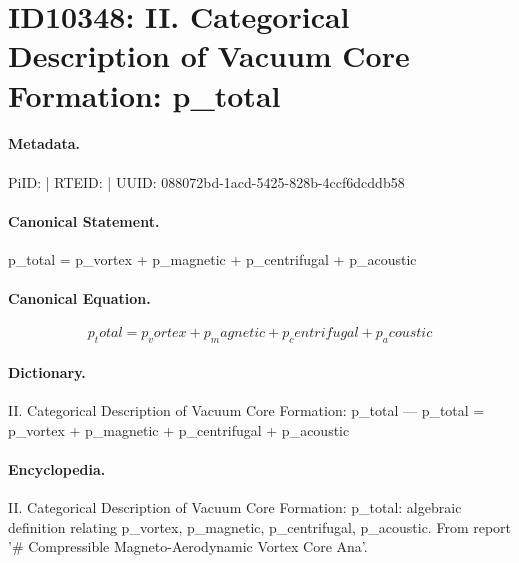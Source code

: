 \section*{ID10348: II. Categorical Description of Vacuum Core Formation: p\_total}
\paragraph{Metadata.}
PiID:  | RTEID:  | UUID: 088072bd-1acd-5425-828b-4ccf6dcddb58

\paragraph{Canonical Statement.}
p\_total = p\_vortex + p\_magnetic + p\_centrifugal + p\_acoustic

\paragraph{Canonical Equation.}
\[
p_total = p_vortex + p_magnetic + p_centrifugal + p_acoustic
\]

\paragraph{Dictionary.}
II. Categorical Description of Vacuum Core Formation: p\_total — p\_total = p\_vortex + p\_magnetic + p\_centrifugal + p\_acoustic

\paragraph{Encyclopedia.}
II. Categorical Description of Vacuum Core Formation: p\_total: algebraic definition relating p\_vortex, p\_magnetic, p\_centrifugal, p\_acoustic. From report '\# Compressible Magneto-Aerodynamic Vortex Core Ana'.
